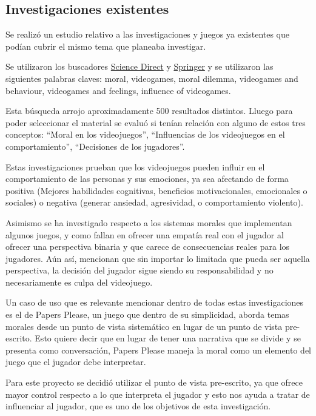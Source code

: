 \subsection{Investigaciones existentes}\label{sec:investigaciones}
Se realizó un estudio relativo a las investigaciones y juegos ya existentes que podían cubrir el mismo tema que planeaba investigar. 

Se utilizaron los buscadores \href{https://www.sciencedirect.com/}{Science Direct} y \href{https://www.springer.com/}{Springer} y se utilizaron las siguientes palabras claves: moral, videogames, moral dilemma, videogames and behaviour, videogames and feelings, influence of videogames.

Esta búsqueda arrojo aproximadamente 500 resultados distintos. Lluego para poder seleccionar el material se evaluó si tenían relación con alguno de estos tres conceptos: ``Moral en los videojuegos'', ``Influencias de los videojuegos en el comportamiento'', ``Decisiones de los jugadores''.

Estas investigaciones prueban que los videojuegos pueden influir en el comportamiento de las personas y sus emociones, ya sea afectando de forma positiva (Mejores habilidades cognitivas, beneficios motivacionales, emocionales o sociales) o negativa (generar ansiedad, agresividad, o comportamiento violento)\cite{impacts-games-behaviours}.

Asimismo se ha investigado respecto a los sistemas morales que implementan algunos juegos, y como fallan en ofrecer una empatía real con el jugador al ofrecer una perspectiva binaria y que carece de consecuencias reales para los jugadores\cite{ethics-single}\cite{only-game}. Aún así, mencionan que sin importar lo limitada que pueda ser aquella perspectiva, la decisión del jugador sigue siendo su responsabilidad  y no necesariamente es culpa del videojuego\cite{free-will}.

Un caso de uso que es relevante mencionar dentro de todas estas investigaciones es el de Papers Please, un juego que dentro de su simplicidad, aborda temas morales desde un punto de vista sistemático en lugar de un punto de vista pre-escrito. Esto quiere decir que en lugar de tener una narrativa que se divide y se presenta como conversación, Papers Please maneja la moral como un elemento del juego que el jugador debe interpretar\cite{papers}.

Para este proyecto se decidió utilizar el punto de vista pre-escrito, ya que ofrece mayor control respecto a lo que interpreta el jugador y esto nos ayuda a tratar de influenciar al jugador, que es uno de los objetivos de esta investigación.


